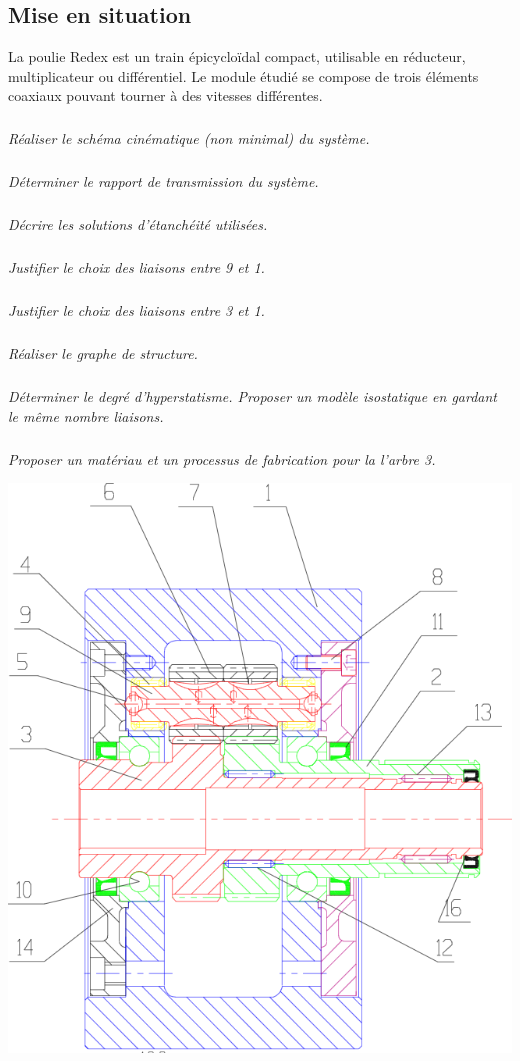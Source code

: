 \ifprof
\else
\begin{multicols}{2}
\fi

\section*{Mise en situation}
\ifprof
\else
La poulie Redex est un train épicycloïdal compact, utilisable en réducteur, multiplicateur ou différentiel. Le module étudié se compose de trois éléments coaxiaux pouvant tourner à des vitesses différentes. 



\subparagraph{}\textit{Réaliser le schéma cinématique (non minimal) du système.}

\subparagraph{}\textit{Déterminer le rapport de transmission du système.}

\subparagraph{}\textit{Décrire les solutions d'étanchéité utilisées.}

\subparagraph{}\textit{Justifier le choix des liaisons entre 9 et 1.}

\subparagraph{}\textit{Justifier le choix des liaisons entre 3 et 1.}

\subparagraph{}\textit{Réaliser le graphe de structure.}

\subparagraph{}\textit{Déterminer le degré d'hyperstatisme. Proposer un modèle isostatique en gardant le même nombre liaisons.}

\subparagraph{}\textit{Proposer un matériau et un processus de fabrication pour la l'arbre 3.}

\end{multicols}

\begin{center}
\includegraphics[width=.6\textwidth]{images/redex}
\end{center}
